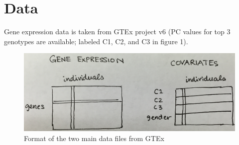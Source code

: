 \documentclass[11pt, oneside]{article}   	%
\begin{document}
\section{Data}

Gene expression data is taken from GTEx project v6 (PC values for top 3 genotypes are available; labeled C1, C2, and C3 in figure 1).

\begin{figure}[!h]
\center
\includegraphics[width=12cm]{gtex}
\caption{Format of the two main data files from GTEx}
\end{figure}
\end{document}
